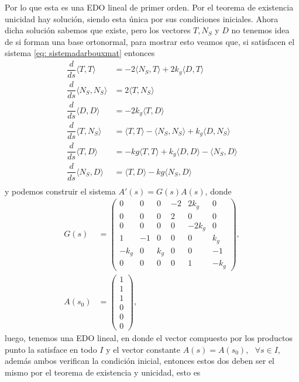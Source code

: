 \documentclass[oneside,11pt]{memoir}
\begin{document}
Por lo que esta es una EDO lineal de primer orden. Por el teorema de existencia unicidad hay solución, siendo esta única por sus condiciones iniciales. Ahora dicha solución sabemos que existe, pero los vectores $T, N_S$ y $D$ no tenemos idea de si forman una base ortonormal, para mostrar esto veamos que, si satisfacen el sistema \ref{eq: sistemadarbouxmat} entonces
\begin{align*}
    \dfrac{d}{ds}\langle T,T \rangle&=-2\langle N_S,T \rangle+2k_g\langle D,T \rangle\\
    \dfrac{d}{ds}\langle N_S, N_S \rangle&=2\langle T,N_S \rangle\\
    \dfrac{d}{ds}\langle D,D\rangle&=-2k_g\langle T,D \rangle\\
    \dfrac{d}{ds}\langle T,N_S\rangle&=\langle T,T \rangle-\langle N_S,N_S \rangle+k_g\langle D,N_S \rangle\\
    \dfrac{d}{ds}\langle T,D\rangle&=-kg\langle T,T \rangle+k_g\langle D,D \rangle-\langle N_S,D \rangle\\
    \dfrac{d}{ds}\langle N_S, D\rangle&=\langle T,D \rangle-kg\langle N_S,D \rangle\\
\end{align*}
y podemos construir el sistema $A'(s)=G(s)A(s)$, donde
\newpage
\begin{align*}
G(s)&=
    \begin{pmatrix}
        0&0&0&-2&2k_g&0\\
        0&0&0&2&0&0\\
        0&0&0&0&-2k_g&0\\
        1&-1&0&0&0&k_g\\
        -k_g&0&k_g&0&0&-1\\
        0&0&0&0&1&-k_g
    \end{pmatrix},\\
    A(s_0)&=\begin{pmatrix}
       1\\
       1\\
       1\\
       0\\
       0\\
       0
    \end{pmatrix},
\end{align*}
 luego, tenemos una EDO lineal, en donde el vector compuesto por los productos punto la satisface en todo $I$ y el vector constante $A(s)=A(s_0),\text{ }\forall s\in I$, además ambos verifican la condición inicial, entonces estos dos deben ser el mismo por el teorema de existencia y unicidad, esto es
\end{document}
